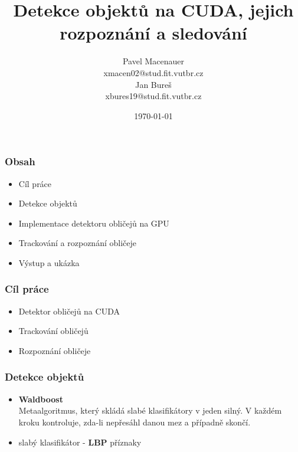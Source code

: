 \documentclass{beamer}
\title{\textbf{Detekce objektů na CUDA, jejich rozpoznání a sledování}}
\author{
	\large{Pavel Macenauer} \\ 
	\tiny{xmacen02@stud.fit.vutbr.cz} \\ 
	\large{Jan Bureš} \\ 
	\tiny{xbures19@stud.fit.vutbr.cz}
}
\date{\tiny{\today}}
\institute[FIT VUTBR]
{
	\inst{}
	Fakulta Informačních Technologií \\
	Vysoké Učení Technické v Brně
}
\begin{document}
	\begin{frame}[t,plain]
	\titlepage
	\tableofcontents[currentsection]
	\vspace{-10mm}
	\end{frame}


	\begin{frame}[t,fragile]
		\frametitle{Obsah}	
		
		\begin{itemize}
			\item Cíl práce
			\item Detekce objektů
			\item Implementace detektoru obličejů na GPU
			\item Trackování a rozpoznání obličeje
			\item Výstup a ukázka		
		\end{itemize}			
				
	\end{frame}
	

	
	
	\begin{frame}[t,fragile]
		\frametitle{Cíl práce}
		
		\begin{itemize}
			\item Detektor obličejů na CUDA
			\item Trackování obličejů
			\item Rozpoznání obličeje
		\end{itemize}		
		
	\end{frame}



	\begin{frame}[t,fragile]
		\frametitle{Detekce objektů}
		
		\begin{itemize}
			\item \textbf{Waldboost} \\ Metaalgoritmus, který skládá slabé klasifikátory v jeden silný. V každém kroku kontroluje, zda-li nepřesáhl danou mez a případně skončí.
			\item slabý klasifikátor - \textbf{LBP} příznaky
		\end{itemize}	
			

	\end{frame}
	
\end{document}
